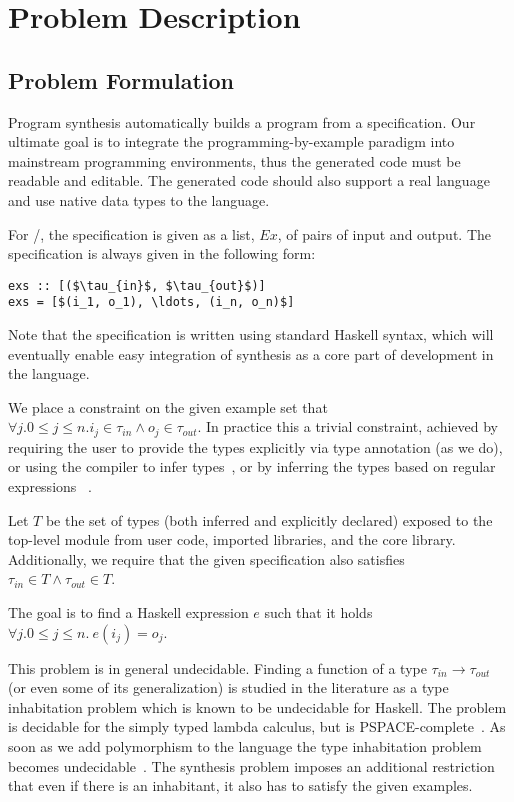 \section{Problem Description}
\label{problem}

\subsection{Problem Formulation}


Program synthesis automatically builds a program from a specification.
Our ultimate goal is to integrate the programming-by-example paradigm 
into mainstream programming environments, thus the generated code must be readable and editable. The generated code should also support a real language and use native data types to the language.

For \ourTool/, the specification is given as a list, $Ex$, of pairs of input and output. The specification is always given in the following 
form:
\begin{lstlisting}[mathescape=true]
exs :: [($\tau_{in}$, $\tau_{out}$)]
exs = [$(i_1, o_1), \ldots, (i_n, o_n)$]
\end{lstlisting}


Note that the specification is written using standard Haskell syntax, which will eventually enable easy integration of synthesis as a core part of development in the language.

We place a constraint on the given example set that $\forall j. 0 \le j \le n. i_j \in \tau_{in} \land o_j \in \tau_{out}$. In practice this a trivial constraint, achieved by requiring the user to provide the types explicitly via type annotation (as we do), or using the compiler to infer types~\cite{ghc}, or by inferring the types based on regular expressions~\cite{gulwani_popl15} .

Let $T$ be the set of types (both inferred and explicitly declared) exposed to the top-level module from user code, imported libraries, and the core library. Additionally, we require that the given specification also satisfies $\tau_{in} \in T \land
\tau_{out} \in T$.

The goal is to find a Haskell expression $e$ such that it holds $\forall j. 0 \le j \le n.\  e (i_j) = o_j$.

This problem is in general undecidable. Finding a function of a type 
$\tau_{in} \rightarrow \tau_{out}$ (or even some of its generalization) is studied in the literature as a type inhabitation problem which is known to be undecidable 
for Haskell. The problem is decidable for 
 the simply typed lambda calculus, but is PSPACE-complete~\cite{DBLP:conf/tlca/Urzyczyn97}. 
 As soon as we add polymorphism to the language the type inhabitation problem becomes undecidable~\cite{DBLP:conf/lics/Wells94}. The synthesis problem imposes an additional restriction that even if there is an inhabitant, it also has to satisfy the given examples.

